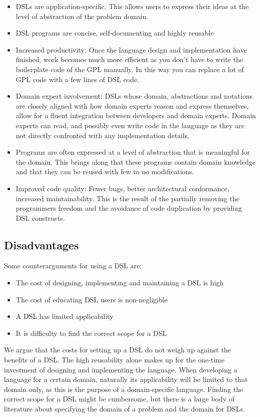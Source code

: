 \begin{itemize}
\item DSLs are application-specific. This allows users to express their ideas at the level of abstraction of the problem domain.
\item DSL programs are concise, self-documenting and highly reusable\cite{Bentley:1986}
\item Increased productivity: Once the language design and implementation have finished, work becomes much more efficient as you don't have to write the boilerplate code of the GPL manually. In this way you can replace a lot of GPL code with a few lines of DSL code.
\item Domain expert involvement: DSLs whose domain, abstractions and notations are closely aligned with how domain experts reason and express themselves, allow for a fluent integration between developers and domain experts. Domain experts can read, and possibly even write code in the language as they are not directly confronted with any implementation details.
\item Programs are often expressed at a level of abstraction that is meaningful for the domain. This brings along that these programs contain domain knowledge and that they can be reused with few to no modifications.
\item Improved code quality: Fewer bugs, better architectural conformance, increased maintainability. This is the result of the partially removing the programmers freedom and the avoidance of code duplication by providing DSL constructs.
\end{itemize}

\subsection*{Disadvantages}

Some counterarguments for using a DSL are:

\begin{itemize}
\item The cost of designing, implementing and maintaining a DSL is high
\item The cost of educating DSL users is non-negligible
\item A DSL has limited applicability
\item It is difficulty to find the correct scope for a DSL
\end{itemize}

We argue that the costs for setting up a DSL do not weigh up against the benefits of a DSL. The high reusability alone makes up for the one-time investment of designing and implementing the language. When developing a language for a certain domain, naturally its applicability will be limited to that domain only, as this is the purpose of a domain-specific language. Finding the correct scope for a DSL might be cumbersome, but there is a large body of literature about specifying the domain of a problem\cite{Simos:1995} and the domain for DSLs\cite{karsai2014design}\cite{gunther2010agile}. 

